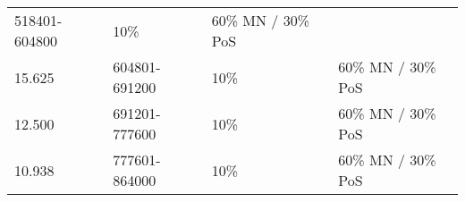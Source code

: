 \documentclass[11pt,a4paperpaper,]{report}
\begin{document}
\begin{longtable}[c]{@{}llll@{}}
\begin{minipage}[t]{0.22\columnwidth}\raggedright\strut
518401-604800
\strut\end{minipage} &
\begin{minipage}[t]{0.15\columnwidth}\raggedright\strut
10\%
\strut\end{minipage} &
\begin{minipage}[t]{0.27\columnwidth}\raggedright\strut
60\% MN / 30\% PoS
\strut\end{minipage}\tabularnewline
\begin{minipage}[t]{0.12\columnwidth}\raggedright\strut
15.625
\strut\end{minipage} &
\begin{minipage}[t]{0.22\columnwidth}\raggedright\strut
604801-691200
\strut\end{minipage} &
\begin{minipage}[t]{0.15\columnwidth}\raggedright\strut
10\%
\strut\end{minipage} &
\begin{minipage}[t]{0.27\columnwidth}\raggedright\strut
60\% MN / 30\% PoS
\strut\end{minipage}\tabularnewline
\begin{minipage}[t]{0.12\columnwidth}\raggedright\strut
12.500
\strut\end{minipage} &
\begin{minipage}[t]{0.22\columnwidth}\raggedright\strut
691201-777600
\strut\end{minipage} &
\begin{minipage}[t]{0.15\columnwidth}\raggedright\strut
10\%
\strut\end{minipage} &
\begin{minipage}[t]{0.27\columnwidth}\raggedright\strut
60\% MN / 30\% PoS
\strut\end{minipage}\tabularnewline
\begin{minipage}[t]{0.12\columnwidth}\raggedright\strut
10.938
\strut\end{minipage} &
\begin{minipage}[t]{0.22\columnwidth}\raggedright\strut
777601-864000
\strut\end{minipage} &
\begin{minipage}[t]{0.15\columnwidth}\raggedright\strut
10\%
\strut\end{minipage} &
\begin{minipage}[t]{0.27\columnwidth}\raggedright\strut
60\% MN / 30\% PoS
\strut\end{minipage}\tabularnewline

\end{longtable}
\end{document}
